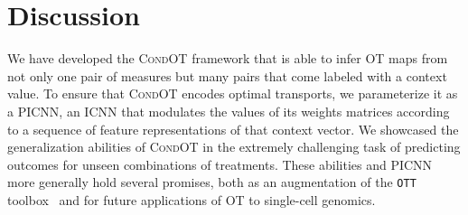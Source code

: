 \section{Discussion}
We have developed the \textsc{CondOT} framework that is able to infer OT maps from not only one pair of measures but many pairs that come labeled with a context value. To ensure that \textsc{CondOT} encodes optimal transports, we parameterize it as a PICNN, an \acrlong{ICNN} that modulates the values of its weights matrices according to a sequence of feature representations of that context vector. We showcased the generalization abilities of \textsc{CondOT} in the extremely challenging task of predicting outcomes for unseen combinations of treatments. These abilities and PICNN more generally hold several promises, both as an augmentation of the \texttt{OTT} toolbox~\citep{cuturi2022optimal} and for future applications of OT to single-cell genomics.
